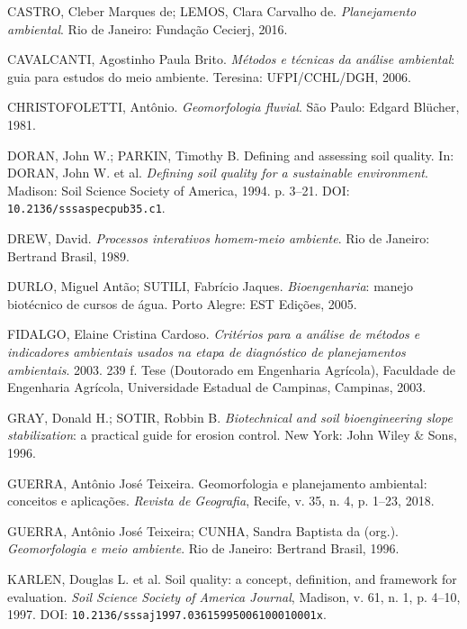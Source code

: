 \begin{list}{}{%
  \setlength{\leftmargin}{1.6em}%
  \setlength{\itemindent}{-1.6em}%
  \setlength{\itemsep}{4.5pt}%
  \setlength{\parsep}{0pt}%
  \setlength{\topsep}{4pt}%
}
  \item CASTRO, Cleber Marques de; LEMOS, Clara Carvalho de. \textit{Planejamento ambiental}. Rio de Janeiro: Fundação Cecierj, 2016.

  \item CAVALCANTI, Agostinho Paula Brito. \textit{Métodos e técnicas da análise ambiental}: guia para estudos do meio ambiente. Teresina: UFPI/CCHL/DGH, 2006.

  \item CHRISTOFOLETTI, Antônio. \textit{Geomorfologia fluvial}. São Paulo: Edgard Blücher, 1981.

  \item DORAN, John W.; PARKIN, Timothy B. Defining and assessing soil quality. In: DORAN, John W. et al. \textit{Defining soil quality for a sustainable environment}. Madison: Soil Science Society of America, 1994. p. 3--21. DOI: \texttt{10.2136/sssaspecpub35.c1}.

  \item DREW, David. \textit{Processos interativos homem-meio ambiente}. Rio de Janeiro: Bertrand Brasil, 1989.

  \item DURLO, Miguel Antão; SUTILI, Fabrício Jaques. \textit{Bioengenharia}: manejo biotécnico de cursos de água. Porto Alegre: EST Edições, 2005.

  \item FIDALGO, Elaine Cristina Cardoso. \textit{Critérios para a análise de métodos e indicadores ambientais usados na etapa de diagnóstico de planejamentos ambientais}. 2003. 239 f. Tese (Doutorado em Engenharia Agrícola), Faculdade de Engenharia Agrícola, Universidade Estadual de Campinas, Campinas, 2003.

  \item GRAY, Donald H.; SOTIR, Robbin B. \textit{Biotechnical and soil bioengineering slope stabilization}: a practical guide for erosion control. New York: John Wiley \& Sons, 1996.

  \item GUERRA, Antônio José Teixeira. Geomorfologia e planejamento ambiental: conceitos e aplicações. \textit{Revista de Geografia}, Recife, v. 35, n. 4, p. 1--23, 2018.

  \item GUERRA, Antônio José Teixeira; CUNHA, Sandra Baptista da (org.). \textit{Geomorfologia e meio ambiente}. Rio de Janeiro: Bertrand Brasil, 1996.

  \item KARLEN, Douglas L. et al. Soil quality: a concept, definition, and framework for evaluation. \textit{Soil Science Society of America Journal}, Madison, v. 61, n. 1, p. 4--10, 1997. DOI: \texttt{10.2136/sssaj1997.03615995006100010001x}.


\end{list}
